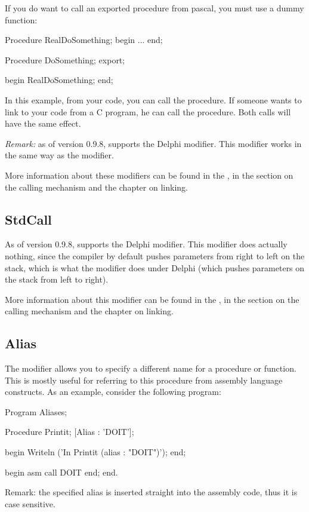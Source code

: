 \documentclass{report}
\begin{document}
If you do want to call an exported procedure from pascal, you must use a
dummy function:
\begin{listing}
Procedure RealDoSomething;
begin
...
end;

Procedure DoSomething; export;

begin
  RealDoSomething;
end; 
\end{listing}
In this example, from your \fpc code, you can call the 
procedure. If someone wants to link to your code from a C program, he can
call the  procedure. Both calls will have the same effect.

{\em Remark:}
as of version 0.9.8, \fpc supports the Delphi  modifier. 
This modifier works in the same way as the  modifier.

More information about these modifiers can be found in the \progref, in the
section on the calling mechanism and the chapter on linking.

\subsection{StdCall}
As of version 0.9.8, \fpc supports the Delphi  modifier.
This modifier does actually nothing, since the \fpc compiler by default 
pushes parameters from right to left on the stack, which is what the 
modifier does under Delphi (which pushes parameters on the stack from left to 
right).

More information about this modifier can be found in the \progref, in the
section on the calling mechanism and the chapter on linking.

\subsection{Alias}
The  modifier allows you to specify a different name for a
procedure or function. This is mostly useful for referring to this procedure
from assembly language constructs. As an example, consider the following
program:

\begin{listing}
Program Aliases;

Procedure Printit; [Alias : 'DOIT'];

begin
  Writeln ('In Printit (alias : "DOIT")');
end;

begin
  asm
  call DOIT
  end;
end.
\end{listing}
{\rm Remark:} the specified alias is inserted straight into the assembly
code, thus it is case sensitive.
\end{document}
